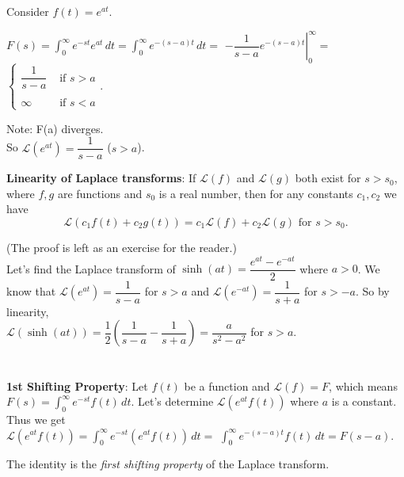 \documentclass{ximera}
\begin{document}
\newpage


 Consider  $f(t)=e^{at}$.

 $\displaystyle F(s)=\int_{0}^{\infty}e^{-st}e^{at}\,dt=\int_{0}^{\infty}e^{-(s-a)t}\,dt=$  $\displaystyle \left.-\dfrac{1}{s-a}e^{-(s-a)t}\right|_{0}^{\infty}=$  $\displaystyle \left\{
     \begin{array}{lr}
       \dfrac{1}{s-a} & \mbox{ if }s>a\\
       \\
       \infty &  \mbox{ if }s< a
     \end{array}\right.$.

Note: F(a) diverges.\\

  So $\mathcal{L}(e^{at})=\dfrac{1}{s-a}$ ($s>a$).



 \textbf{Linearity of Laplace transforms}: If $\mathcal{L}(f)$ and $\mathcal{L}(g)$ both exist for $s>s_{0}$, where $f,g$ are functions and $s_0$ is a real number, then for any constants $c_{1},c_{2}$  we have $$\mathcal{L}(c_{1}f(t)+c_{2}g(t))=c_{1}\mathcal{L}(f)+c_{2}\mathcal{L}(g)\mbox{ for }s>s_{0}.$$


(The proof is left as an exercise for the reader.) \\

 Let's find the Laplace transform of $\sinh{(at)}=\dfrac{e^{at}-e^{-at}}{2}$ where $a>0$.   We know that $\mathcal{L}(e^{at})=\dfrac{1}{s-a}$ for $s>a$  and $\mathcal{L}(e^{-at})=\dfrac{1}{s+a}$ for $s>-a$.   So by linearity, \\$\mathcal{L}(\sinh{(at)})=\dfrac{1}{2}\left( \dfrac{1}{s-a}-\dfrac{1}{s+a}\right)=\dfrac{a}{s^{2}-a^{2}}$ for $s>a$.\\ \\  \\


 \textbf{1st Shifting Property}:   Let $f(t)$ be a function and $\mathcal{L}(f)=F$,  which means \\$\displaystyle F(s)=\int_{0}^{\infty}e^{-st}f(t)\,dt$.  Let's determine $\mathcal{L}(e^{at}f(t))$ where $a$ is a constant.  Thus we get\\ $\displaystyle \mathcal{L}(e^{at}f(t))=\int_{0}^{\infty}e^{-st}(e^{at}f(t))\,dt=$  $\displaystyle \int_{0}^{\infty}e^{-(s-a)t}f(t)\,dt=F(s-a).$

 The identity   is the \emph{first shifting property} of the Laplace transform.\\
\end{document}
